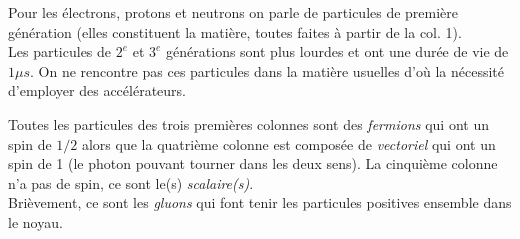 \documentclass	[11pt, a4paper, openany]{book}
\begin{document}
Pour les électrons, protons et neutrons on parle de particules de première génération (elles constituent la matière, toutes faites à partir de la col. 1).\\
Les particules de $2^e$ et $3^e$ générations sont plus lourdes et ont une durée de vie de $1 \mu s$. On ne rencontre pas ces particules dans la matière usuelles d'où la nécessité d'employer des accélérateurs.\\
\begin{center}
\end{center}
Toutes les particules des trois premières colonnes sont des \textit{fermions} qui ont un spin de $1/2$ alors que la quatrième colonne est composée de \textit{vectoriel} qui ont un spin de 1 (le photon pouvant tourner dans les deux sens). La cinquième colonne n'a pas de spin, ce sont le(s) \textit{scalaire(s)}.\\
Brièvement, ce sont les \textit{gluons} qui font tenir les particules positives ensemble dans le noyau.
\end{document}
